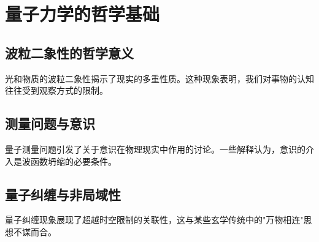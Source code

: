 \section{量子力学的哲学基础}

\subsection{波粒二象性的哲学意义}

光和物质的波粒二象性揭示了现实的多重性质。这种现象表明，我们对事物的认知往往受到观察方式的限制。

\subsection{测量问题与意识}

量子测量问题引发了关于意识在物理现实中作用的讨论。一些解释认为，意识的介入是波函数坍缩的必要条件。

\subsection{量子纠缠与非局域性}

量子纠缠现象展现了超越时空限制的关联性，这与某些玄学传统中的"万物相连"思想不谋而合。 
